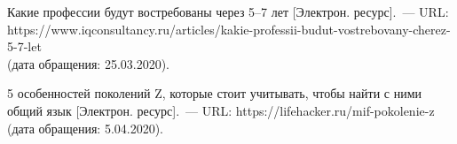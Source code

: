 \begin{thebibliography}{99}
\bibitem{}\BibAuthor{}Какие профессии будут востребованы через 5--7 лет [Электрон. ресурс].~--- URL: https://www.iqconsultancy.ru/articles/kakie-professii-budut-vostrebovany-cherez-5-7-let \\(дата обращения: 25.03.2020).

\bibitem{}\BibAuthor{}5 особенностей поколений Z, которые стоит учитывать, чтобы найти с ними общий язык [Электрон. ресурс].~--- URL: https://lifehacker.ru/mif-pokolenie-z (дата обращения: 5.04.2020).
\end{thebibliography}
\thispagestyle{empty}
